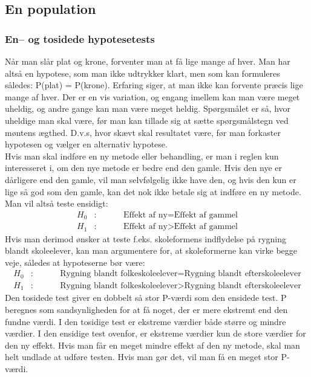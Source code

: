 \documentclass[11pt]{article}
\begin{document}
\subsection{En population}
\subsubsection{En-- og tosidede hypotesetests}
Når man slår plat og krone, forventer man at få lige mange af hver. Man har altså en hypotese, som man ikke udtrykker klart, men som kan formuleres således: P(plat) = P(krone). Erfaring siger, at man ikke kan forvente præcis lige mange af hver. Der er en vis variation, og engang imellem kan man være meget uheldig, og andre gange kan man være meget heldig. Spørgsmålet er så, hvor uheldige man skal være, før man kan tillade sig at sætte spørgsmålstegn ved møntens ægthed. D.v.s, hvor skævt skal resultatet være, før man forkaster hypotesen og vælger en alternativ hypotese.\\[0.2cm]
Hvis man skal indføre en ny metode eller behandling, er man i reglen kun interesseret i, om den nye metode er bedre end den gamle. Hvis den nye er dårligere end den gamle, vil man selvfølgelig ikke have den, og hvis den kun er lige så god som den gamle, kan det nok ikke betale sig at indføre en ny metode. Man vil altså teste ensidigt:
\begin{eqnarray*}
H_0&:&\hspace{1cm}\text{Effekt af ny}=\text{Effekt af gammel}\\
H_1&:&\hspace{1cm}\text{Effekt af ny}>\text{Effekt af gammel}
\end{eqnarray*}
Hvis man derimod ønsker at teste f.eks. skoleformens indflydelse på rygning blandt skoleelever, kan man argumentere for, at skoleformerne kan virke begge veje, således at hypoteserne bør være:
\begin{eqnarray*}
H_0&:&\hspace{1cm}\text{Rygning blandt folkeskoleelever}=\text{Rygning blandt efterskoleelever}\\
H_1&:&\hspace{1cm}\text{Rygning blandt folkeskoleelever}>\text{Rygning blandt efterskoleelever}
\end{eqnarray*}
Den tosidede test giver en dobbelt så stor P-værdi som den ensidede test. P beregnes som sandsynligheden for at få noget, der er mere ekstremt end den fundne værdi. I den tosidige test er ekstreme værdier både større og mindre værdier. I den ensidige test ovenfor, er ekstreme værdier kun de store værdier for den ny effekt. Hvis man får en meget mindre effekt af den ny metode, skal man helt undlade at udføre testen. Hvis man gør det, vil man få en meget stor P-værdi.\\[0.2cm]
\end{document}
